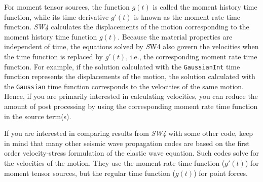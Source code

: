\documentclass[11pt]{report}
\begin{document}
For moment tensor sources, the function $g(t)$ is called the moment history time function, while its
time derivative $g'(t)$ is known as the moment rate time function. \emph{SW4} calculates the
displacements of the motion corresponding to the moment history time function $g(t)$. Because
the material properties are independent of time, the equations solved by {\emph SW4} also govern the
velocities when the time function is replaced by $g'(t)$, i.e., the corresponding moment rate time
function. For example, if the solution calculated with the {\tt GaussianInt} time function
represents the displacements of the motion, the solution calculated with the {\tt Gaussian} time
function corresponds to the velocities of the same motion. Hence, if you are primarily interested in
calculating velocities, you can reduce the amount of post processing by using the corresponding
moment rate time function in the source term(s).

If you are interested in comparing results from \emph{SW4} with some other code, keep in mind that
many other seismic wave propagation codes are based on the first order velocity-stress formulation
of the elastic wave equation. Such codes solve for the velocities of the motion. They use the moment
rate time function ($g'(t)$) for moment tensor sources, but the regular time function ($g(t)$) for
point forces.
\end{document}
